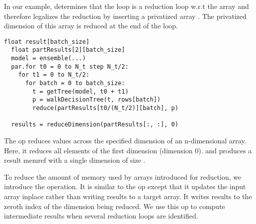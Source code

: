 In our example, \Treebeard{} determines that the  loop is a reduction 
loop w.r.t the  array and therefore legalizes 
the reduction by inserting a privatized array 
. The privatized dimension of this array 
is reduced at the end of the  loop.

\begin{lstlisting}[style=c++]
  float result[batch_size]
  float partResults[2][batch_size]
  model = ensemble(...) 
  par.for t0 = 0 to N_t step N_t/2:
    for t1 = 0 to N_t/2:
      for batch = 0 to batch_size:
        t = getTree(model, t0 + t1) 
        p = walkDecisionTree(t, rows[batch])
        reduce(partResults[t0/(N_t/2)][batch], p)
  
  results = reduceDimension(partResults[:, :], 0)
\end{lstlisting}

The op  reduces values across the specified
dimension of an n-dimensional array. Here, 
it reduces all elements of the first dimension (dimension 0). 
and produces a result memref with a single dimension of size .

To reduce the amount of memory used by arrays introduced for reduction,
we introduce the  operation. It is similar to the 
 op except that it updates the input array inplace
rather than writing results to a target array. It writes results to the 
zeroth index of the dimension being reduced. We use this op to 
compute intermediate results when several reduction loops are identified.

  
  

